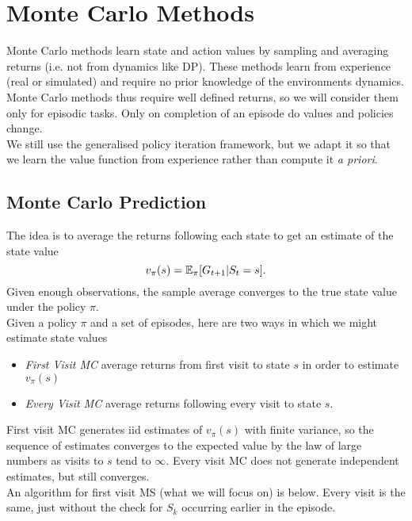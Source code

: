 
\section{Monte Carlo Methods}
Monte Carlo methods learn state and action values by sampling and averaging returns (i.e. not from dynamics like DP). These methods learn from experience (real or simulated) and require no prior knowledge of the environments dynamics.\\

Monte Carlo methods thus require well defined returns, so we will consider them only for episodic tasks. Only on completion of an episode do values and policies change.\\

We still use the generalised policy iteration framework, but we adapt it so that we learn the value function from experience rather than compute it \emph{a priori}.


\subsection{Monte Carlo Prediction}
The idea is to average the returns following each state to get an estimate of the state value
\[
    v_\pi(s) = \mathbb{E}_{\pi}{} [G_{t+1} | S_t =s].
\]
Given enough observations, the sample average converges to the true state value under the policy $\pi$.\\

Given a policy $\pi$ and a set of episodes, here are two ways in which we might estimate state values
\begin{itemize}
    \item \emph{First Visit MC} average returns from first visit to state $s$ in order to estimate $v_\pi(s)$
    \item \emph{Every Visit MC} average returns following every visit to state $s$.
\end{itemize}

First visit MC generates iid estimates of $v_\pi(s)$ with finite variance, so the sequence of estimates converges to the expected value by the law of large numbers as visits to $s$ tend to $\infty$. Every visit MC does not generate independent estimates, but still converges.\\

An algorithm for first visit MS (what we will focus on) is below. Every visit is the same, just without the check for $S_k$ occurring earlier in the episode.\\

